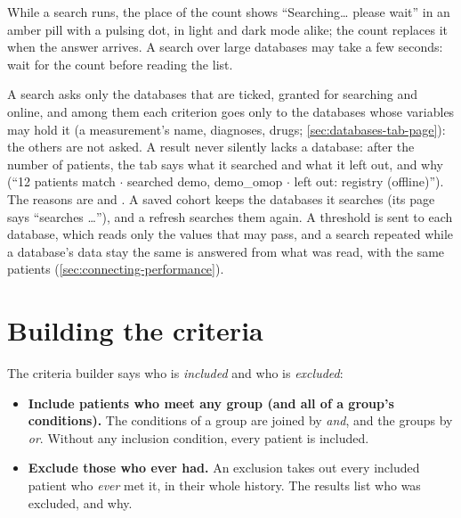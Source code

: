 While a search runs, the place of the count shows ``Searching\dots{} please wait'' in an amber
pill with a pulsing dot, in light and dark mode alike; the count replaces it when the answer
arrives. A search over large databases may take a few seconds: wait for the count before
reading the list.

A search asks only the databases that are ticked, granted for searching and online, and among
them each criterion goes only to the databases whose variables may hold it (a measurement's
name, diagnoses, drugs; \cref{sec:databases-tab-page}): the others are not asked. A result never
silently lacks a database: after the number of patients, the tab says what it searched and what
it left out, and why (``12 patients match $\cdot$ searched demo, demo\_omop $\cdot$ left out:
registry (offline)'').
The reasons are  and . A saved cohort keeps the databases it
searches (its page says ``searches \dots''), and a refresh searches them again. A threshold is
sent to each database, which reads only the values that may pass, and a search repeated while a
database's data stay the same is answered from what was read, with the same patients
(\cref{sec:connecting-performance}).

\section{Building the criteria}
\label{sec:cohorts-builder}

The criteria builder says who is \emph{included} and who is \emph{excluded}:
\begin{itemize}
\item \textbf{Include patients who meet any group (and all of a group's conditions).} The
  conditions of a group are joined by \emph{and}, and the groups by \emph{or}. Without any
  inclusion condition, every patient is included.
\item \textbf{Exclude those who ever had.} An exclusion takes out every included patient who
  \emph{ever} met it, in their whole history. The results list who was excluded, and why.
\end{itemize}

